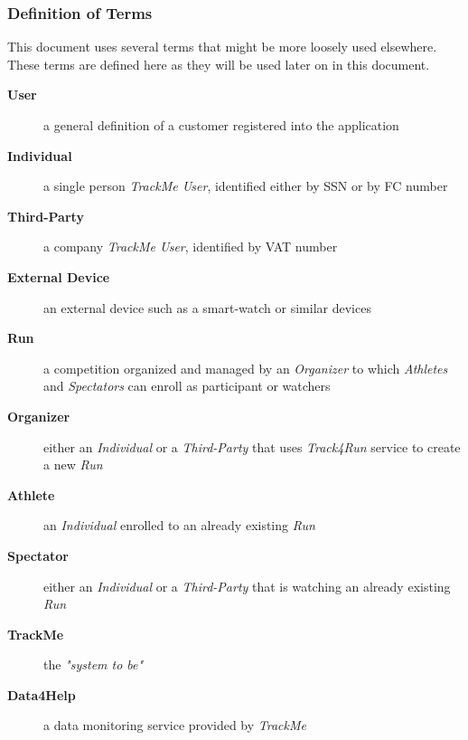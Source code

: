 \documentclass[a4paper]{article}
\begin{document}
            \subsubsection{Definition of Terms}
            This document uses several terms that might be more loosely used elsewhere. These terms are defined here as they will be used later on in this document.
                \begin{description}
                    \item[\textbf{User}] a general definition of a customer registered into the application
                    
                    \item[\textbf{Individual}] a single person \textit{TrackMe User}, identified either by SSN or by FC number
                    
                    \item[\textbf{Third-Party}] a company \textit{TrackMe User}, identified by VAT number
                    
                    \item[\textbf{External Device}] an external device such as a smart-watch or similar devices
                    
                    \item[\textbf{Run}] a competition organized and managed by an \textit{Organizer} to which \textit{Athletes} and \textit{Spectators} can enroll as participant or watchers
                    
                    \item[\textbf{Organizer}] either an \textit{Individual} or a \textit{Third-Party} that uses \textit{Track4Run} service to create a new \textit{Run}
                    
                    \item[\textbf{Athlete}] an \textit{Individual} enrolled to an already existing \textit{Run}
                    
                    \item[\textbf{Spectator}] either an \textit{Individual} or a \textit{Third-Party} that is watching an already existing \textit{Run}
                    
                    \item[\textbf{TrackMe}] the \textit{"system to be"}
                    
                    \item[\textbf{Data4Help}] a data monitoring service provided by \textit{TrackMe}
                    

\end{description}
\end{document}
